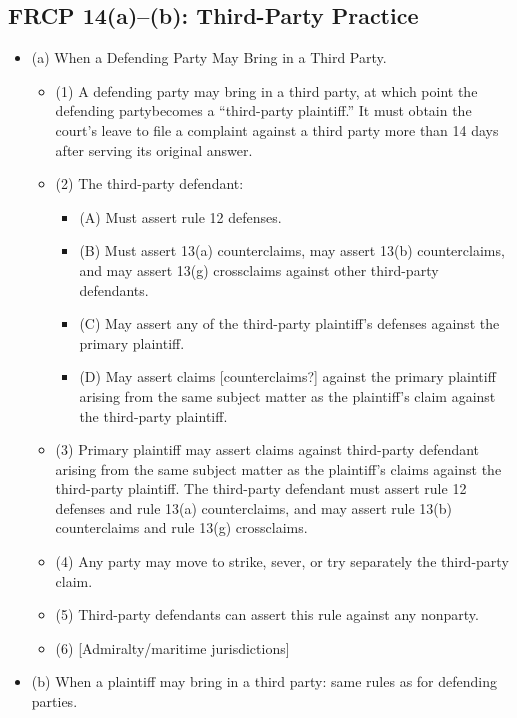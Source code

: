 \subsection{FRCP 14(a)--(b): Third-Party Practice}

\begin{itemize}
    \item (a) When a Defending Party May Bring in a Third Party.
    \begin{itemize}
        \item (1) A defending party may bring in a third party, at which point 
        the defending partybecomes a ``third-party plaintiff.'' It must obtain 
        the court's leave to file a complaint against a third party more than 
        14 days after serving its original answer.
        \item (2) The third-party defendant:
        \begin{itemize}
            \item (A) Must assert rule 12 defenses.
            \item (B) Must assert 13(a) counterclaims, may assert 13(b) 
            counterclaims, and may assert 13(g) crossclaims against other 
            third-party defendants.
            \item (C) May assert any of the third-party plaintiff's defenses 
            against the primary plaintiff.
            \item (D) May assert claims [counterclaims?] against the primary 
            plaintiff arising from the same subject matter as the plaintiff's 
            claim against the third-party plaintiff.
        \end{itemize}
        \item (3) Primary plaintiff may assert claims against third-party 
        defendant arising from the same subject matter as the plaintiff's 
        claims against the third-party plaintiff. The third-party defendant 
        must assert rule 12 defenses and rule 13(a) counterclaims, and may 
        assert rule 13(b) counterclaims and rule 13(g) crossclaims.
        \item (4) Any party may move to strike, sever, or try separately the 
        third-party claim.
        \item (5) Third-party defendants can assert this rule against any 
        nonparty.
        \item (6) [Admiralty/maritime jurisdictions]
    \end{itemize}
    \item (b) When a plaintiff may bring in a third party: same rules as for 
    defending parties.
\end{itemize}

